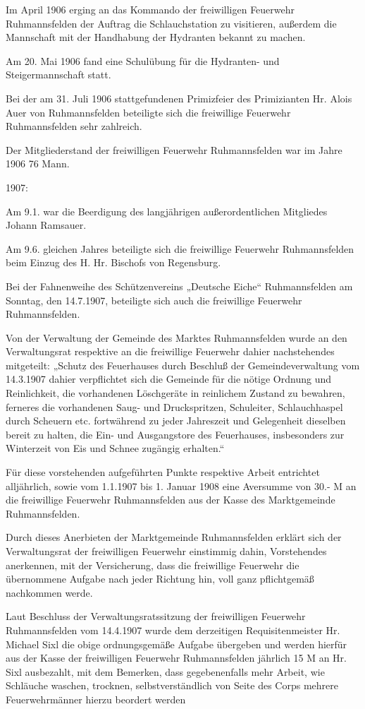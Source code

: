 \documentclass[12pt,a4pager]{book}
\begin{document}
Im April 1906 erging an das Kommando der freiwilligen Feuerwehr Ruhmannsfelden
der Auftrag die Schlauchstation zu visitieren, außerdem die Mannschaft mit der
Handhabung der Hydranten bekannt zu machen.

Am 20. Mai 1906 fand eine Schulübung für die Hydranten- und Steigermannschaft
statt.

Bei der am 31. Juli 1906 stattgefundenen Primizfeier des Primizianten Hr. Alois
Auer von Ruhmannsfelden beteiligte sich die freiwillige Feuerwehr Ruhmannsfelden
sehr zahlreich.

Der Mitgliederstand der freiwilligen Feuerwehr Ruhmannsfelden war im Jahre 1906
76 Mann.

1907:

Am 9.1. war die Beerdigung des langjährigen außerordentlichen Mitgliedes Johann
Ramsauer.

Am 9.6. gleichen Jahres beteiligte sich die freiwillige Feuerwehr Ruhmannsfelden
beim Einzug des H. Hr. Bischofs von Regensburg.

Bei der Fahnenweihe des Schützenvereins „Deutsche Eiche“ Ruhmannsfelden am
Sonntag, den 14.7.1907, beteiligte sich auch die freiwillige Feuerwehr
Ruhmannsfelden.

Von der Verwaltung der Gemeinde des Marktes Ruhmannsfelden wurde an den
Verwaltungsrat respektive an die freiwillige Feuerwehr dahier nachstehendes
mitgeteilt: „Schutz des Feuerhauses durch Beschluß der Gemeindeverwaltung vom
14.3.1907 dahier verpflichtet sich die Gemeinde für die nötige Ordnung und
Reinlichkeit, die vorhandenen Löschgeräte in reinlichem Zustand zu bewahren,
ferneres die vorhandenen Saug- und Druckspritzen, Schuleiter, Schlauchhaspel
durch Scheuern etc. fortwährend zu jeder Jahreszeit und Gelegenheit dieselben
bereit zu halten, die Ein- und Ausgangstore des Feuerhauses, insbesonders zur
Winterzeit von Eis und Schnee zugängig erhalten.“

Für diese vorstehenden aufgeführten Punkte respektive Arbeit entrichtet
alljährlich, sowie vom 1.1.1907 bis 1. Januar 1908 eine Aversumme von 30.- M an
die freiwillige Feuerwehr Ruhmannsfelden aus der Kasse des Marktgemeinde
Ruhmannsfelden.

Durch dieses Anerbieten der Marktgemeinde Ruhmannsfelden erklärt sich der
Verwaltungsrat der freiwilligen Feuerwehr einstimmig dahin, Vorstehendes
anerkennen, mit der Versicherung, dass die freiwillige Feuerwehr die übernommene
Aufgabe nach jeder Richtung hin, voll ganz pflichtgemäß nachkommen werde.

Laut Beschluss der Verwaltungsratssitzung der freiwilligen Feuerwehr
Ruhmannsfelden vom 14.4.1907 wurde dem derzeitigen Requisitenmeister Hr. Michael
Sixl die obige ordnungsgemäße Aufgabe übergeben und werden hierfür aus der Kasse
der freiwilligen Feuerwehr Ruhmannsfelden jährlich 15 M an Hr. Sixl ausbezahlt,
mit dem Bemerken, dass gegebenenfalls mehr Arbeit, wie Schläuche waschen,
trocknen, selbstverständlich von Seite des Corps mehrere Feuerwehrmänner hierzu
beordert werden
\end{document}
